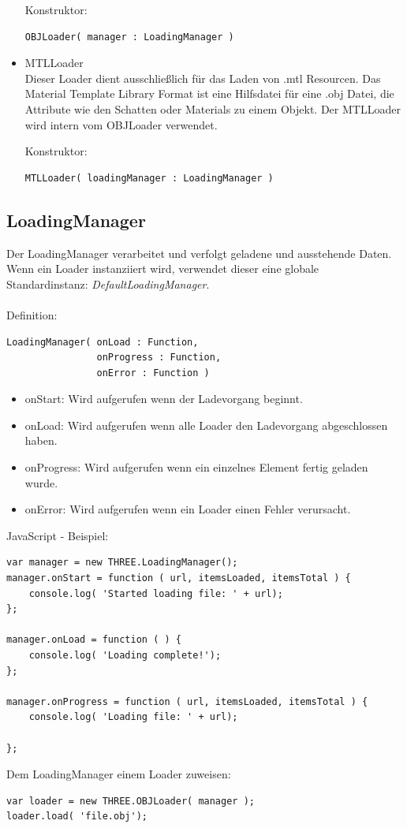\begin{itemize}
    Konstruktor:
    \begin{lstlisting}
OBJLoader( manager : LoadingManager )
    \end{lstlisting}
    
    \item MTLLoader \cite{three.js_MTLLoader}\\
    Dieser Loader dient ausschließlich für das Laden von .mtl Resourcen. Das Material Template Library Format ist eine Hilfsdatei für eine .obj Datei, die Attribute wie den Schatten oder Materials zu einem Objekt. Der MTLLoader wird intern vom OBJLoader verwendet.
    
    Konstruktor:
    \begin{lstlisting}
MTLLoader( loadingManager : LoadingManager )
    \end{lstlisting}
\end{itemize}
\clearpage \newpage
\subsection{LoadingManager}
Der LoadingManager verarbeitet und verfolgt geladene und ausstehende Daten. \\ Wenn ein Loader instanziiert wird, verwendet dieser eine globale Standardinstanz: \textit{DefaultLoadingManager}. \cite{LoadingManager} \\ \\
Definition:
\begin{lstlisting}
LoadingManager( onLoad : Function,
                onProgress : Function,
                onError : Function )
\end{lstlisting}
\begin{itemize}
    \item onStart: Wird aufgerufen wenn der Ladevorgang beginnt. 
    \item onLoad: Wird aufgerufen wenn alle Loader den Ladevorgang abgeschlossen haben. 
    \item onProgress: Wird aufgerufen wenn ein einzelnes Element fertig geladen wurde. 
    \item onError: Wird aufgerufen wenn ein Loader einen Fehler verursacht.
\end{itemize}
JavaScript - Beispiel:
\begin{lstlisting}
var manager = new THREE.LoadingManager();
manager.onStart = function ( url, itemsLoaded, itemsTotal ) {
    console.log( 'Started loading file: ' + url);
};

manager.onLoad = function ( ) {
    console.log( 'Loading complete!');
};

manager.onProgress = function ( url, itemsLoaded, itemsTotal ) {
    console.log( 'Loading file: ' + url);

};
\end{lstlisting}
Dem LoadingManager einem Loader zuweisen:
\begin{lstlisting}
var loader = new THREE.OBJLoader( manager );
loader.load( 'file.obj');
\end{lstlisting}

